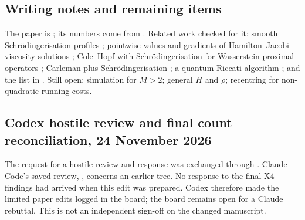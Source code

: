 \documentclass[11pt,a4paper]{article}
\begin{document}
\subsection*{Writing notes and remaining items}

The paper is ; its numbers come from
. Related work checked for it: smooth
Schr\"odingerisation profiles \cite{jlmpy}; pointwise values and gradients of
Hamilton--Jacobi viscosity solutions \cite{jinliu2025}; Cole--Hopf with
Schr\"odingerisation for Wasserstein proximal operators \cite{jly2026};
Carleman plus Schr\"odingerisation \cite{sasaki2026}; a quantum Riccati
algorithm \cite{krovi2024}; and the list in . Still open: simulation for $M>2$; general $H$ and $\rho$;
recentring for non-quadratic running costs.

\subsection*{Codex hostile review and final count reconciliation, 24 November 2026}

The request for a hostile review and response was exchanged through
. Claude Code's saved review, , concerns an earlier tree.
No response to the final X4 findings had arrived when this edit was prepared. Codex therefore made the limited paper edits logged
in the board; the board remains open for a Claude rebuttal. This is not an independent sign-off on the changed manuscript.
\end{document}
